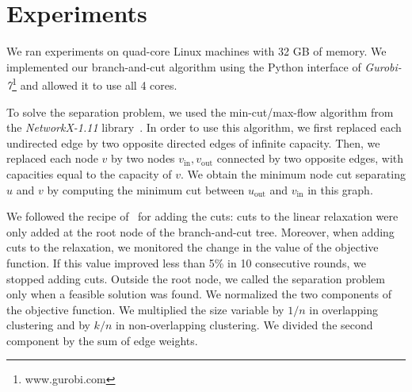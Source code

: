 \documentclass[conference]{IEEEtran}
\begin{document}
\section{Experiments}
\label{sec:experiments}
%
%
%
%
We ran experiments on quad-core Linux machines with 32 GB of memory. We implemented our branch-and-cut algorithm using the Python interface
of \emph{Gurobi-7}\footnote{www.gurobi.com} and allowed it to use all 4 cores.

To solve the separation problem, we used the min-cut/max-flow algorithm from the \emph{NetworkX-1.11} library~\cite{NetworkX}. In order to use this algorithm, we first replaced
each undirected edge by two opposite directed edges of infinite capacity.
Then, we replaced each node $v$ by two nodes $v_{\text{in}}, v_{\text{out}}$ connected by two opposite
edges, with capacities equal to the capacity of $v$. We obtain the
minimum node cut separating $u$ and $v$ by computing the minimum cut
between $u_{\text{out}}$ and $v_{\text{in}}$ in this graph.

We followed the recipe of~\cite{CarvajalCGVW13} for adding the cuts: cuts to the
linear relaxation were only added at the root node of the branch-and-cut tree.
Moreover, when adding cuts to the relaxation, we monitored the change in
the value of the objective function. If this value improved less than 5\% in 10 consecutive rounds, we stopped adding cuts. 
Outside the root node, we called the separation problem only when a feasible solution was
found.
We normalized the two components of the objective function. We multiplied the size variable by $1/n$ in overlapping clustering and by $k/n$ in non-overlapping clustering. We divided the second component by the sum of edge weights.
\end{document}
